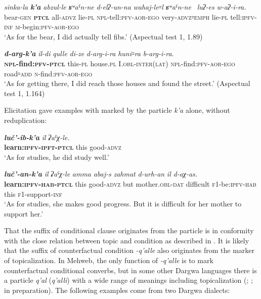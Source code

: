 ﻿\documentclass[output=paper]{langsci/langscibook}
\begin{document}
\ea \label{ex:5:151} %
\gll \emph{sinka-la} \emph{\textbf{k'a}} \emph{abzul-le} \emph{ʁʷaˤn-ne} \emph{d-elʔ-un-na} \emph{wahaj-le꞊l} \emph{ʁʷaˤn-ne~} \emph{luʔ-es} \emph{w-aʔ-i-ra.}\\
 bear-\textsc{gen} \textbf{\textsc{ptcl}} all-\textsc{advz} lie-\textsc{pl} \textsc{npl}-tell:\textsc{pfv}-\textsc{aor}-\textsc{ego} very-\textsc{advz}꞊\textsc{emph} lie-\textsc{pl} tell:\textsc{ipfv}-\textsc{inf} \textsc{m}-begin:\textsc{pfv}-\textsc{aor}-\textsc{ego}\\
\glt `As for the bear, I did actually tell fibs.' (Aspectual test 1, 1.89)

\ex \label{ex:5:152} %
\gll \emph{\textbf{d-arg-k'a}} \emph{il-di} \emph{qulle} \emph{di-ze} \emph{d-arg-i-ra} \emph{huni꞊ra} \emph{b-arg-i-ra.}\\
 \textbf{\textsc{npl}-find:\textsc{pfv}-\textsc{ptcl}} this-\textsc{pl} house.\textsc{pl} I.\textsc{obl}-\textsc{inter}(\textsc{lat}) \textsc{npl}-find:\textsc{pfv}-\textsc{aor}-\textsc{ego} road꞊\textsc{add} \textsc{n}-find:\textsc{pfv}-\textsc{aor}-\textsc{ego}\\ 
\glt `As for getting there, I did reach those houses and found the street.' (Aspectual test 1, 1.164)
\z

Elicitation gave examples with  marked by the
particle \emph{k'a} alone, without reduplication:

\ea %
\gll \emph{\textbf{luč'-ib-k'a}} \emph{il} \emph{ʡaˤχ-le.}\\
 \textbf{learn:\textsc{ipfv}-\textsc{ipft}-\textsc{ptcl}} this good-\textsc{advz}\\
\glt `As for studies, he did study well.'

\ex %
\gll \emph{\textbf{luč'-an-k'a}} \emph{il} \emph{ʡaˤχ-le} \emph{amma} \emph{abaj-s} \emph{zahmat} \emph{d-urh-an} \emph{il} \emph{d-aχ-as.}\\
\textbf{learn:\textsc{ipfv}-\textsc{hab}-\textsc{ptcl}} this good-\textsc{advz} but mother.\textsc{obl}-\textsc{dat} difficult \textsc{f1}-be:\textsc{ipfv}-\textsc{hab} this \textsc{f1}-support-\textsc{inf} \\
\glt 
`As for studies, she makes good progress. But it is difficult for her
mother to support her.'
\z

That the suffix of conditional clause originates from the 
particle is in conformity with the close relation between topic and
condition as described in \citet{haiman1978}. It is likely that the suffix of
counterfactual condition \emph{-q'alle} also originates from the marker
of topicalization. In Mehweb, the only function of \mbox{\emph{-q'alle}} is to
mark counterfactual conditional converbs, but in some other Dargwa
languages there is a particle \emph{q'al} (\emph{q'alli}) with a wide
range of meanings including topicalization (\citealt{maisak2010};
\citealt{mutalov-sumbatova2003}; \citeauthor{forker:sanzhi} in preparation).
The following examples come from two Dargwa dialects:
\end{document}
